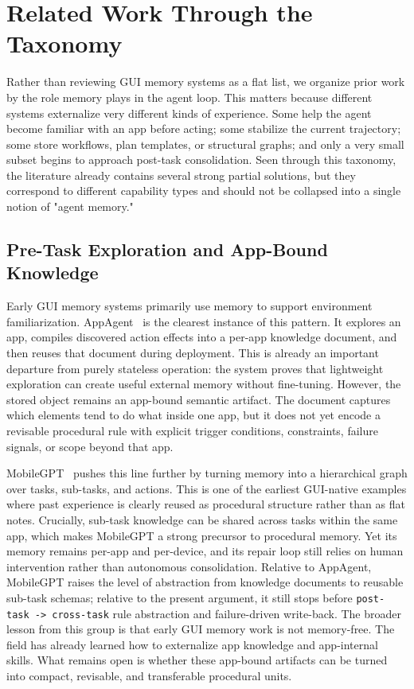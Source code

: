 \documentclass{article}
\begin{document}
\section{Related Work Through the Taxonomy}\label{5-related-work-through-the-taxonomy}

Rather than reviewing GUI memory systems as a flat list, we organize
prior work by the role memory plays in the agent loop. This matters
because different systems externalize very different kinds of
experience. Some help the agent become familiar with an app before
acting; some stabilize the current trajectory; some store workflows,
plan templates, or structural graphs; and only a very small subset
begins to approach post-task consolidation. Seen through this taxonomy,
the literature already contains several strong partial solutions, but
they correspond to different capability types and should not be
collapsed into a single notion of "agent memory."

\subsection{Pre-Task Exploration and App-Bound Knowledge}\label{51-pre-task-exploration-and-app-bound-knowledge}

Early GUI memory systems primarily use memory to support environment
familiarization. AppAgent~\parencite{zhang2023appagentmultimodalagentssmartphone} is the clearest
instance of this pattern. It explores an app, compiles discovered
action effects into a per-app knowledge document, and then reuses that
document during deployment. This is already an important departure from
purely stateless operation: the system proves that lightweight
exploration can create useful external memory without fine-tuning.
However, the stored object remains an app-bound semantic artifact. The
document captures which elements tend to do what inside one app, but it
does not yet encode a revisable procedural rule with explicit trigger
conditions, constraints, failure signals, or scope beyond that app.

MobileGPT~\parencite{lee2024exploreselectderiverecall} pushes this line further by
turning memory into a hierarchical graph over tasks, sub-tasks, and
actions. This is one of the earliest GUI-native examples where past
experience is clearly reused as procedural structure rather than as flat
notes. Crucially, sub-task knowledge can be shared across tasks within
the same app, which makes MobileGPT a strong precursor to procedural
memory. Yet its memory remains per-app and per-device, and its repair
loop still relies on human intervention rather than autonomous
consolidation. Relative to AppAgent, MobileGPT raises the level of
abstraction from knowledge documents to reusable sub-task schemas;
relative to the present argument, it still stops before
\texttt{post-task\ -\textgreater{}\ cross-task} rule abstraction and
failure-driven write-back. The broader lesson from this group is that
early GUI memory work is not memory-free. The field has already learned
how to externalize app knowledge and app-internal skills. What remains
open is whether these app-bound artifacts can be turned into compact,
revisable, and transferable procedural units.
\end{document}
